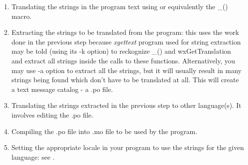 \begin{enumerate}\itemsep=0pt

\item Translating the strings in the program text using 
 or equivalently the \_() macro.

\item Extracting the strings to be translated from the program: this uses the
work done in the previous step because {\it xgettext} program used for string
extraction may be told (using its -k option) to reckognize \_() and
wxGetTranslation and extract all strings inside the calls to these functions.
Alternatively, you may use -a option to extract all the strings, but it will
usually result in many strings being found which don't have to be translated at
all. This will create a text message catalog - a .po file.

\item Translating the strings extracted in the previous step to other
language(s). It involves editing the .po file.

\item Compiling the .po file into .mo file to be used by the program.

\item Setting the appropriate locale in your program to use the strings for the
given language: see .

\end{enumerate}

